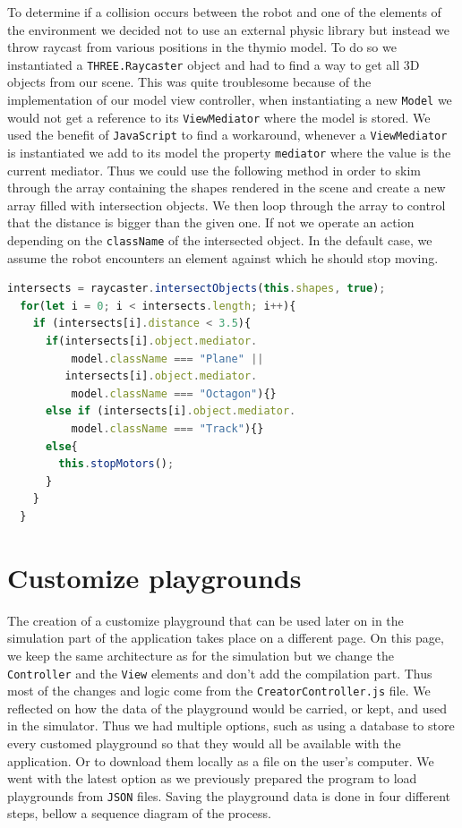 \documentclass{scrbook}
\begin{document}
To determine if a collision occurs between the robot and one of the elements of the environment we decided not to use an external physic library but instead we throw raycast from various positions in the thymio model. To do so we instantiated a \texttt{THREE.Raycaster} 
object and had to find a way to get all 3D objects from our scene. This was quite troublesome because of the implementation of our model view controller, when instantiating a new \texttt{Model} we would not get a reference to its \texttt{ViewMediator} where the model is stored. 
We used the benefit of \texttt{JavaScript} to find a workaround, whenever a \texttt{ViewMediator} is instantiated we add to its model the property \texttt{mediator} where the value is the current mediator. Thus we could use the following method in order to skim through the array containing the shapes rendered in the scene and create a new array filled with intersection objects. We then loop through the array to control that the distance is bigger than the given one. If not we operate an action depending on the \texttt{className} of the intersected object. 
In the default case, we assume the robot encounters an element against which he should stop moving.

\begin{lstlisting}[language=JavaScript, gobble=2, basicstyle=\ttfamily\small]
  intersects = raycaster.intersectObjects(this.shapes, true);
  for(let i = 0; i < intersects.length; i++){
    if (intersects[i].distance < 3.5){
      if(intersects[i].object.mediator.
          model.className === "Plane" ||
         intersects[i].object.mediator.
          model.className === "Octagon"){}
      else if (intersects[i].object.mediator.
          model.className === "Track"){}
      else{
        this.stopMotors();
      }
    }
  }
\end{lstlisting} 

\section{Customize playgrounds}

The creation of a customize playground that can be used later on in the simulation part of the application takes place on a different page. On this page, we keep the same architecture as for the simulation but we change the \texttt{Controller} and the \texttt{View} elements 
and don't add the compilation part. Thus most of the changes and logic come from the \texttt{CreatorController.js} file. We reflected  on how the data of the playground would be carried, or kept, and used in the simulator. Thus we had multiple options,
such as using a database to store every customed playground so that they would all be available with the application. Or to download  them locally as a file on the user's computer. We went with the latest option as we previously prepared the program to load playgrounds from \texttt{JSON} files.
Saving the playground data is done in four different steps, bellow a sequence diagram of the process.
\end{document}

